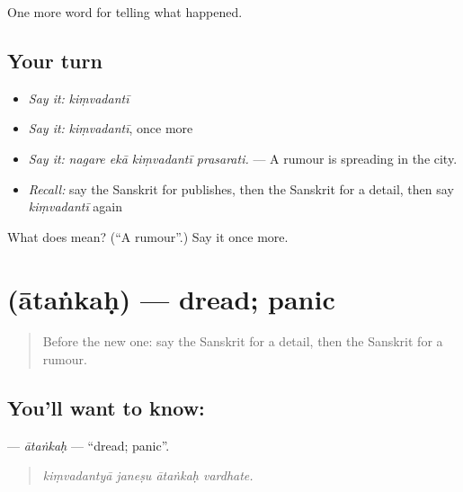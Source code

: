 \begin{grammarlens}[title={What you've built}]
One more word for telling what happened.
\end{grammarlens}

\subsection*{Your turn}
\begin{itemize}
\raggedright
  \item \emph{Say it:} \emph{kiṃvadantī}
  \item \emph{Say it:} \emph{kiṃvadantī}, once more
  \item \emph{Say it:} \emph{nagare ekā kiṃvadantī prasarati.} — A rumour is spreading in the city.
  \item \emph{Recall:} say the Sanskrit for publishes, then the Sanskrit for a detail, then say \emph{kiṃvadantī} again
\end{itemize}

\begin{tcolorbox}[breakable,colback=teal!4,colframe=teal!35!black,title={Before you move on}]
What does  mean? (\textquotedblleft{}A rumour\textquotedblright{}.) Say it once more.
\end{tcolorbox}
\section[\texorpdfstring{\sk{आतंकः} (ātaṅkaḥ)}{आतंकः (ātaṅkaḥ)}]{ (ātaṅkaḥ) — dread; panic}

\label{lesson:SA-C311-atankah}



\begin{quote}
Before the new one: say the Sanskrit for a detail, then the Sanskrit for a rumour.
\end{quote}

\subsection*{You'll want to know: }
\textbf{} — \emph{ātaṅkaḥ} — \textquotedblleft{}dread; panic\textquotedblright{}.

\begin{quote}
   
\end{quote}

\begin{quote}
\emph{kiṃvadantyā janeṣu ātaṅkaḥ vardhate.}
\end{quote}

